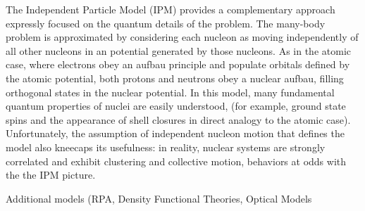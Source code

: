 The Independent Particle Model (IPM) provides a complementary approach expressly
focused on the quantum details of the problem. The many-body problem is
approximated by considering each nucleon as moving independently of all other
nucleons in an potential generated by those nucleons. As in the atomic case,
where electrons obey an aufbau principle and populate orbitals defined by the
atomic potential, both protons and neutrons obey a nuclear aufbau, filling
orthogonal states in the nuclear potential. In this model, many fundamental
quantum properties of nuclei are easily understood, (for example, ground state spins and
the appearance of shell closures in direct analogy to the atomic case).
Unfortunately, the assumption of independent nucleon motion that defines the model
also kneecaps its usefulness: in reality, nuclear systems are strongly
correlated and exhibit clustering and collective motion, behaviors at odds with the
the IPM picture.

Additional models (RPA, Density Functional Theories, Optical Models


%

